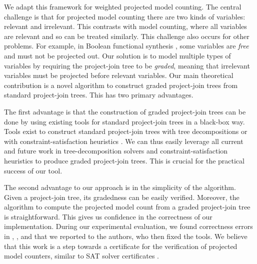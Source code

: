 We adapt this framework for weighted projected model counting. The central challenge is that for projected model counting there are two kinds of variables: relevant and irrelevant. This contrasts with model counting, where all variables are relevant and so can be treated similarly. This challenge also occurs for other problems.
For example, in Boolean functional synthesis \cite{tabajara2017factored}, some variables are \emph{free} and must not be projected out. 
Our solution is to model multiple types of variables by requiring the project-join tree to be \emph{graded}, meaning that irrelevant variables must be projected before relevant variables. Our main theoretical contribution is a novel algorithm to construct graded project-join trees from standard project-join trees. This has two primary advantages. 

The first advantage is that the construction of graded project-join trees can be done by using existing tools for standard project-join trees \cite{dudek2020dpmc} in a black-box way. Tools exist to construct standard project-join trees with tree decompositions \cite{RS91} or with constraint-satisfaction heuristics \cite{tarjan1984simple,koster2001treewidth,dechter03,dechter99,bouquet1999gestion}.
We can thus easily leverage all current and future work in tree-decomposition solvers \cite{strasser2017computing,AMW17,Tamaki17} and constraint-satisfaction heuristics to produce graded project-join trees. This is crucial for the practical success of our tool.

The second advantage to our approach is in the simplicity of the algorithm. Given a project-join tree, its gradedness can be easily verified. 
Moreover, the algorithm to compute the projected model count from a graded project-join tree is straightforward. This gives us confidence in the correctness of our implementation. 
During our experimental evaluation, we found correctness errors in \dfp{} \cite{lagniez2019recursive}, \projmc{} \cite{lagniez2019recursive}, and \ssat{} \cite{lee2017solving} that we reported to the authors, who then fixed the tools. 
We believe that this work is a step towards a certificate for the verification of projected model counters, similar to SAT solver certificates \cite{wetzler2014drat}.

